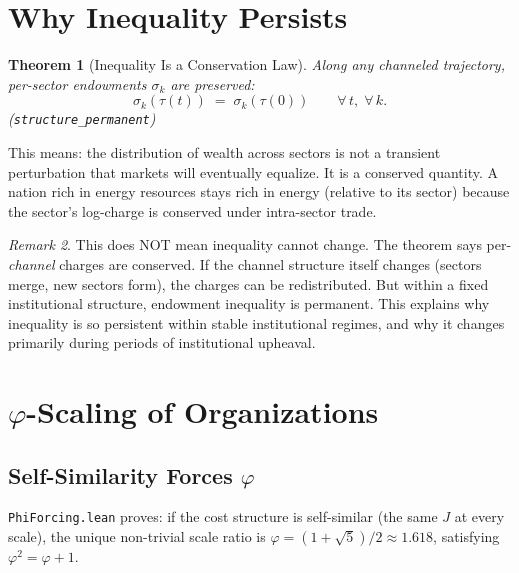 \documentclass[11pt,a4paper]{article}
\theoremstyle{plain}
\newtheorem{theorem}{Theorem}[section]
\theoremstyle{definition}
\theoremstyle{remark}
\newtheorem{remark}[theorem]{Remark}
\newcommand{\Jcost}{J}
\begin{document}
\section{Why Inequality Persists}\label{sec:inequality}

\begin{theorem}[Inequality Is a Conservation Law]
Along any channeled trajectory, per-sector endowments $\sigma_k$ are preserved:
\[
\sigma_k(\tau(t)) \;=\; \sigma_k(\tau(0)) \qquad \forall\, t, \;\forall\, k.
\]
\emph{(\texttt{structure\_permanent})}
\end{theorem}

This means: the distribution of wealth across sectors is not a transient perturbation that markets will eventually equalize.
It is a conserved quantity.
A nation rich in energy resources stays rich in energy (relative to its sector) because the sector's log-charge is conserved under intra-sector trade.

\begin{remark}
This does NOT mean inequality cannot change.
The theorem says per-\emph{channel} charges are conserved.
If the channel structure itself changes (sectors merge, new sectors form), the charges can be redistributed.
But within a fixed institutional structure, endowment inequality is permanent.
This explains why inequality is so persistent within stable institutional regimes, and why it changes primarily during periods of institutional upheaval.
\end{remark}

\section{$\varphi$-Scaling of Organizations}\label{sec:phi}

\subsection{Self-Similarity Forces $\varphi$}

\texttt{PhiForcing.lean} proves: if the cost structure is self-similar (the same $\Jcost$ at every scale), the unique non-trivial scale ratio is $\varphi = (1 + \sqrt{5})/2 \approx 1.618$, satisfying $\varphi^2 = \varphi + 1$.
\end{document}
